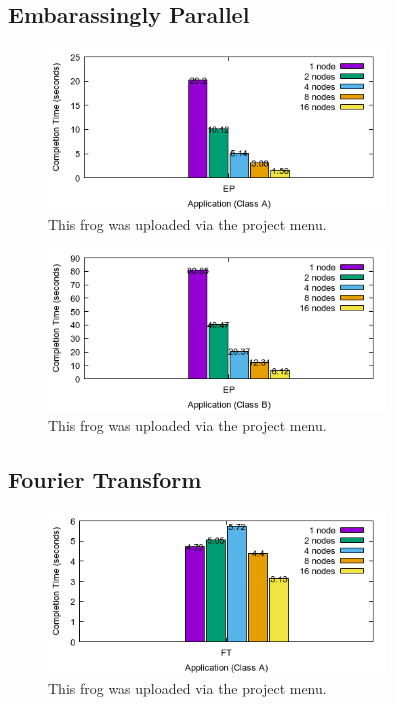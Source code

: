 \documentclass[a4paper]{article}
\begin{document}
\subsection{Embarassingly Parallel}

\begin{figure}[H]
\centering
\includegraphics[width=0.8\textwidth]{figures/EPvA.png}
\caption{\label{fig:EPvA}This frog was uploaded via the project menu.}
\end{figure}

\begin{figure}[H]
\centering
\includegraphics[width=0.8\textwidth]{figures/EPvB.png}
\caption{\label{fig:EPvB}This frog was uploaded via the project menu.}
\end{figure}


\subsection{Fourier Transform}

\begin{figure}[H]
\centering
\includegraphics[width=0.8\textwidth]{figures/FTvA.png}
\caption{\label{fig:FTvA}This frog was uploaded via the project menu.}
\end{figure}
\end{document}
